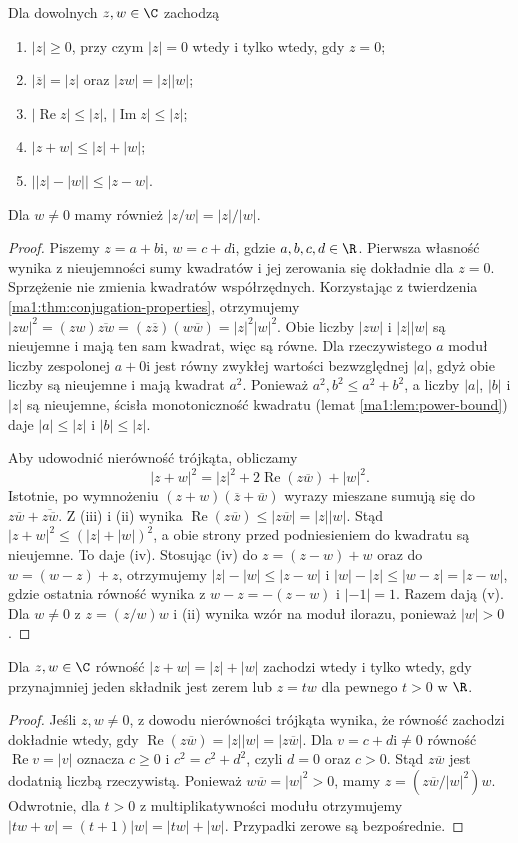 \begin{twierdzenie}
\label{ma1:thm:complex-modulus}
Dla dowolnych $z,w\in\C$ zachodzą
\begin{enumerate}[label=(\roman*)]
\item $|z|\ge0$, przy czym $|z|=0$ wtedy i tylko wtedy, gdy $z=0$;
\item $|\overline z|=|z|$ oraz $|zw|=|z||w|$;
\item $|\operatorname{Re}z|\le |z|$, $|\operatorname{Im}z|\le |z|$;
\item $|z+w|\le |z|+|w|$;
\item $\big||z|-|w|\big|\le |z-w|$.
\end{enumerate}
Dla $w\ne0$ mamy również $|z/w|=|z|/|w|$.
\end{twierdzenie}
\begin{proof}
Piszemy $z=a+b\mathrm i$, $w=c+d\mathrm i$, gdzie $a,b,c,d\in\R$. Pierwsza własność wynika z nieujemności sumy kwadratów i jej zerowania się dokładnie dla $z=0$. Sprzężenie nie zmienia kwadratów współrzędnych. Korzystając z twierdzenia \ref{ma1:thm:conjugation-properties}, otrzymujemy
$|zw|^2=(zw)\overline{zw}=(z\overline z)(w\overline w)=|z|^2|w|^2$.
Obie liczby $|zw|$ i $|z||w|$ są nieujemne i mają ten sam kwadrat, więc są równe. Dla rzeczywistego $a$ moduł liczby zespolonej $a+0\mathrm i$ jest równy zwykłej wartości bezwzględnej $|a|$, gdyż obie liczby są nieujemne i mają kwadrat $a^2$. Ponieważ $a^2,b^2\le a^2+b^2$, a liczby $|a|$, $|b|$ i $|z|$ są nieujemne, ścisła monotoniczność kwadratu (lemat \ref{ma1:lem:power-bound}) daje $|a|\le |z|$ i $|b|\le |z|$.

Aby udowodnić nierówność trójkąta, obliczamy
\[
 |z+w|^2=|z|^2+2\operatorname{Re}(z\overline w)+|w|^2.
\]
Istotnie, po wymnożeniu $(z+w)(\overline z+\overline w)$ wyrazy mieszane sumują się do $z\overline w+\overline{z\overline w}$. Z (iii) i (ii) wynika
$\operatorname{Re}(z\overline w)\le |z\overline w|=|z||w|$.
Stąd $|z+w|^2\le (|z|+|w|)^2$, a obie strony przed podniesieniem do kwadratu są nieujemne. To daje (iv).
Stosując (iv) do $z=(z-w)+w$ oraz do $w=(w-z)+z$, otrzymujemy
$|z|-|w|\le |z-w|$ i $|w|-|z|\le |w-z|=|z-w|$, gdzie ostatnia równość wynika z $w-z=-(z-w)$ i $|-1|=1$. Razem dają (v).
Dla $w\ne0$ z $z=(z/w)w$ i (ii) wynika wzór na moduł ilorazu, ponieważ $|w|>0$.
\end{proof}

\begin{wniosek}
\label{ma1:cor:complex-triangle-equality}
Dla $z,w\in\C$ równość $|z+w|=|z|+|w|$ zachodzi wtedy i tylko wtedy, gdy przynajmniej jeden składnik jest zerem lub $z=tw$ dla pewnego $t>0$ w $\R$.
\end{wniosek}
\begin{proof}
Jeśli $z,w\ne0$, z dowodu nierówności trójkąta wynika, że równość zachodzi dokładnie wtedy, gdy $\operatorname{Re}(z\overline w)=|z||w|=|z\overline w|$. Dla $v=c+d\mathrm i\ne0$ równość $\operatorname{Re}v=|v|$ oznacza $c\ge0$ i $c^2=c^2+d^2$, czyli $d=0$ oraz $c>0$. Stąd $z\overline w$ jest dodatnią liczbą rzeczywistą. Ponieważ $w\overline w=|w|^2>0$, mamy $z=(z\overline w/|w|^2)w$. Odwrotnie, dla $t>0$ z multiplikatywności modułu otrzymujemy $|tw+w|=(t+1)|w|=|tw|+|w|$. Przypadki zerowe są bezpośrednie.
\end{proof}

